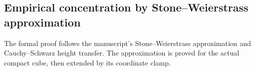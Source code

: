
\subsection{Empirical concentration by Stone--Weierstrass approximation}
\label{leanproof:ANT-2-1}

The formal proof follows the manuscript's Stone--Weierstrass
approximation and Cauchy--Schwarz height transfer. The approximation is
proved for the actual compact cube, then extended by its coordinate clamp.

